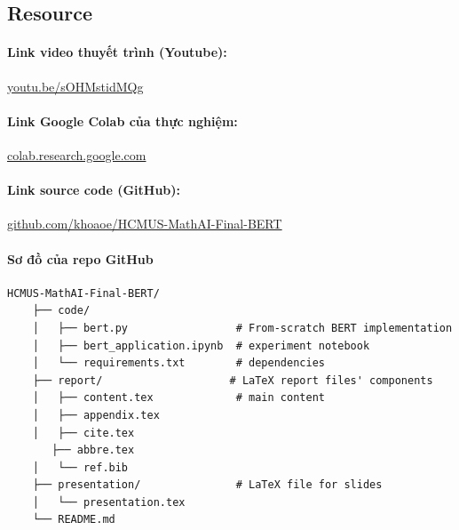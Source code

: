 \subsection{Resource}
\label{subsec:resources}

\paragraph{Link video thuyết trình (Youtube):} \href{https://youtu.be/sOHMstidMQg}{youtu.be/sOHMstidMQg}

\paragraph{Link Google Colab của thực nghiệm:} \href{https://colab.research.google.com/drive/1LeZfdr22j_FC_qEG92QfVIE6dz_ppF6g?usp=sharing}{colab.research.google.com}

\paragraph{Link source code (GitHub):} \href{https://github.com/khoaoe/HCMUS-MathAI-Final-BERT}{github.com/khoaoe/HCMUS-MathAI-Final-BERT}

\paragraph{Sơ đồ của repo GitHub}
\begin{verbatim}
HCMUS-MathAI-Final-BERT/
    ├── code/
    │   ├── bert.py                 # From-scratch BERT implementation
    │   ├── bert_application.ipynb  # experiment notebook
    │   └── requirements.txt        # dependencies
    ├── report/                    # LaTeX report files' components
    │   ├── content.tex             # main content
    │   ├── appendix.tex            
    │   ├── cite.tex
       ├── abbre.tex
    │   └── ref.bib
    ├── presentation/               # LaTeX file for slides
    │   └── presentation.tex
    └── README.md
\end{verbatim}